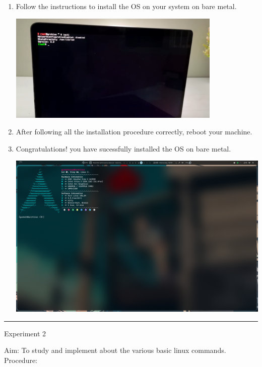 \documentclass[12pt,letterpaper]{article}
\begin{document}
\begin{enumerate}
  \item Follow the instructions to install the OS on your system on bare metal. 
    \begin{center}
      \includegraphics[width=0.8\textwidth]{screens/Pasted image (6).png}
    \end{center}
  \item After following all the installation procedure correctly, reboot your machine.
  \item Congratulations! you have sucessfully installed the OS on bare metal. 
    \begin{center}
      \includegraphics[scale=0.2]{screens/Pasted image (7).png}
    \end{center}
\end{enumerate}

\rule{15.5cm}{0.1mm}%
\pagebreak

\vspace{1cm}

\noindent
\Large {Experiment 2}\\
\vspace{1cm}

\noindent
Aim: To study and implement about the various basic linux commands. 
Procedure:\\  
\small 
\end{document}
